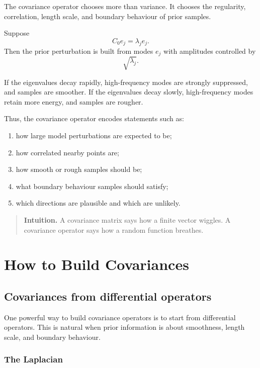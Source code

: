 \documentclass[11pt,a4paper]{book}
\newenvironment{intuition}
  {\begin{quote}\textbf{Intuition.}}
  {\end{quote}}
\begin{document}
The covariance operator chooses more than variance. It chooses the regularity,
correlation, length scale, and boundary behaviour of prior samples.

Suppose
\[
    C_0 e_j=\lambda_j e_j.
\]
Then the prior perturbation is built from modes $e_j$ with amplitudes controlled
by
\[
    \sqrt{\lambda_j}.
\]

If the eigenvalues decay rapidly, high-frequency modes are strongly suppressed,
and samples are smoother. If the eigenvalues decay slowly, high-frequency modes
retain more energy, and samples are rougher.

Thus, the covariance operator encodes statements such as:
\begin{enumerate}[label=\arabic*.]
    \item how large model perturbations are expected to be;
    \item how correlated nearby points are;
    \item how smooth or rough samples should be;
    \item what boundary behaviour samples should satisfy;
    \item which directions are plausible and which are unlikely.
\end{enumerate}

\begin{intuition}
A covariance matrix says how a finite vector wiggles.
A covariance operator says how a random function breathes.
\end{intuition}


\chapter{How to Build Covariances}

\section{Covariances from differential operators}

One powerful way to build covariance operators is to start from differential
operators. This is natural when prior information is about smoothness, length
scale, and boundary behaviour.

\subsection{The Laplacian}
\end{document}
